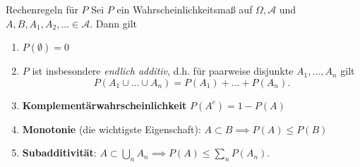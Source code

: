 \documentclass[a4paper, landscape,twocolumn,fontsize=9pt]{scrartcl}
\begin{document}
\begin{lemma}{Rechenregeln für $P$}{}
Sei $P$ ein Wahrscheinlichkeitsmaß auf $\Omega, \mathcal A$ und $A,B, A_1,A_2,... \in \mathcal A$. Dann gilt
\begin{enumerate}
\item $P(\emptyset) = 0$
\item $P$ ist insbesondere \emph{endlich additiv}, d.h. für paarweise disjunkte $A_1,...,A_n$ gilt
\[
	P(A_1 \cup ... \cup A_n) = P(A_1) + ... + P(A_n).
\]

\item \textbf{Komplementärwahrscheinlichkeit} $P(A^c) = 1 - P(A)$

\item \textbf{Monotonie} (die wichtigste Eigenschaft): $A \subset B \implies P(A) \leq P(B)$

\item \textbf{Subadditivität}: $A \subset \bigcup_{n} A_n \implies P(A) \leq \sum_n P(A_n)$.
\end{enumerate}
\end{lemma}
\end{document}
